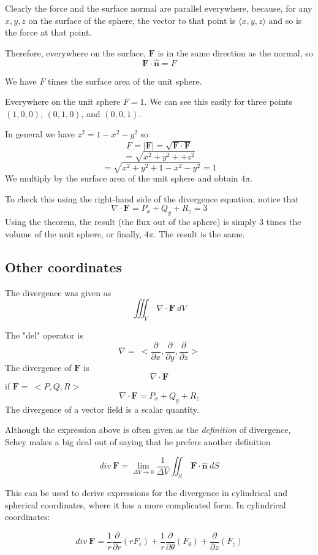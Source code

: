 \documentclass[11pt, oneside]{article}
\begin{document}
Clearly the force and the surface normal are parallel everywhere, because, for any $x,y,z$ on the surface of the sphere, the vector to that point is $\langle x,y,z \rangle$ and so is the force at that point.

Therefore, everywhere on the surface, $\mathbf{F}$ is in the same direction as the normal, so
\[ \mathbf{F} \cdot \mathbf{\hat{n}} = F \]

We have $F$ times the surface area of the unit sphere.

Everywhere on the unit sphere $F = 1$.  We can see this easily for three points $(1,0,0)$, $(0,1,0)$, and $(0,0,1)$.  

In general we have $z^2 = 1 - x^2 - y^2$ so
\[ F = | \mathbf{F} | = \sqrt{\mathbf{F} \cdot \mathbf{F}} \]
\[ =   \sqrt{x^2 + y^2 + + z^2} \]
\[ =   \sqrt{ x^2 + y^2 + 1 - x^2 - y^2} = 1 \]
We multiply by the surface area of the unit sphere and obtain $4 \pi$.

To check this using the right-hand side of the divergence equation, notice that 
\[ \nabla \cdot \mathbf{F} = P_x + Q_y + R_z = 3 \]
Using the theorem, the result (the flux out of the sphere) is simply $3$ times the volume of the unit sphere, or finally, $4 \pi$.  The result is the same.

\subsection*{Other coordinates}

The divergence was given as
\[ \iiint_V \ \nabla \cdot \mathbf{F} \ dV \]

The "del" operator is
\[ \nabla = \ < \frac{\partial}{\partial x},\frac{\partial}{\partial y},\frac{\partial}{\partial z} > \]
The divergence of $\mathbf{F}$ is
\[ \nabla \cdot \mathbf{F} \]
if $\mathbf{F} = \ <P,Q,R>$
\[ \nabla \cdot \mathbf{F} = P_x + Q_y + R_z \]
The divergence of a vector field is a scalar quantity.

Although the expression above is often given as the \emph{definition} of divergence, Schey makes a big deal out of saying that he prefers another definition

\[ div \ \mathbf{F} = \lim_{\Delta V \rightarrow 0} \frac{1}{\Delta V} \iint_S \ \mathbf{F} \cdot \hat{\mathbf{n}} \ dS \]

This can be used to derive expressions for the divergence in cylindrical and spherical coordinates, where it has a more complicated form.  In cylindrical coordinates: 

\[ div \ \mathbf{\mathbf{F}} = \frac{1}{r} \frac{\partial}{\partial r} (rF_r) +  \frac{1}{r} \frac{\partial}{\partial \theta} (F_{\theta}) + \frac{\partial}{\partial z} (F_z) \]
\end{document}
